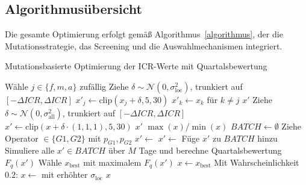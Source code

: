 \subsection{Algorithmusübersicht}
Die gesamte Optimierung erfolgt gemäß Algorithmus~\ref{algorithmus}, der die Mutationsstrategie, das Screening und die Auswahlmechanismen integriert.

\medskip

\begin{algorithm}
\caption{Mutationsbasierte Optimierung der ICR-Werte mit Quartalsbewertung}
\label{algorithmus}
\begin{algorithmic}[1]
  \State Wähle $j \in \{f, m, a\}$ zufällig
  \State Ziehe $\delta \sim \mathcal{N}(0, \sigma_{\text{loc}}^2)$, trunkiert auf $[-\Delta ICR, \Delta ICR]$
  \State $x'_j \gets \text{clip}(x_j + \delta, 5, 30)$
  \State $x'_k \gets x_k$ für $k \neq j$
  \State \Return $x'$
\EndFunction
\State
{}
  \State Ziehe $\delta \sim \mathcal{N}(0, \sigma_{\text{all}}^2)$, trunkiert auf $[-\Delta ICR, \Delta ICR]$
  \State $x' \gets \text{clip}(x + \delta \cdot (1, 1, 1), 5, 30)$
  \State \Return $x'$
\EndFunction
\State
{}
  \State \Return $\max(x) / \min(x)$
\EndFunction
\State
{}
  \State $BATCH \gets \emptyset$
    \State Ziehe Operator $\in \{G1, G2\}$ mit $p_{G1}, p_{G2}$
      \State $x' \gets$ 
    \Else
      \State $x' \gets$ 
    \EndIf
      \State Füge $x'$ zu $BATCH$ hinzu
    \EndIf
  \EndFor
  \State Simuliere alle $x' \in BATCH$ über $M$ Tage und berechne Quartalsbewertung $F_q(x')$
  \State Wähle $x_{\text{best}}$ mit maximalem $F_q(x')$
    \State $x \gets x_{\text{best}}$
  \Else
    \State Mit Wahrscheinlichkeit $0.2$: $x \gets$  mit erhöhter $\sigma_{\text{loc}}$
  \EndIf
  \State \Return $x$
\EndFunction

\end{algorithmic}
\end{algorithm}